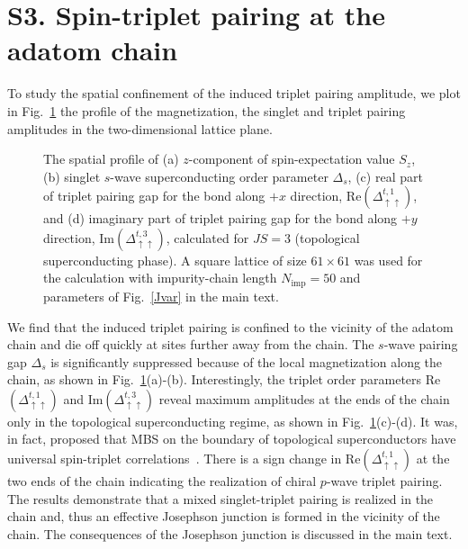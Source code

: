 \documentclass[aps,prl,reprint,nobibnotes]{revtex4-1}
\begin{document}
\section{S3. Spin-triplet pairing at the adatom chain}
To study the spatial confinement of the induced triplet pairing amplitude, we plot in Fig.~\ref{pairing_profile} the profile of the magnetization, the singlet and triplet pairing amplitudes in the two-dimensional lattice plane. 
\begin{figure}[htb!]
\begin{center}
\caption{The spatial profile of (a) $z$-component of spin-expectation value $S_{z}$, (b) singlet $s$-wave superconducting order parameter $\Delta_s$, (c) real part of triplet pairing gap for the bond along $+x$ direction, Re$(\Delta_{\uparrow \uparrow}^{t,1})$, and (d) imaginary part of triplet pairing gap for the bond along $+y$ direction, Im$(\Delta_{\uparrow \uparrow}^{t,3})$, calculated for $JS=3$ (topological superconducting phase). A square lattice of size $61 \times 61$ was used for the calculation with impurity-chain length $N_{\text{imp}}=50$ and parameters of Fig.~\ref{Jvar} in the main text.} 
\label{pairing_profile}
\end{center}
\end{figure}
We find that the induced triplet pairing is confined to the vicinity of the adatom chain and die off quickly at sites further away from the chain. The $s$-wave pairing gap $\Delta_s$ is significantly suppressed because of the local magnetization along the chain, as shown in Fig.~\ref{pairing_profile}(a)-(b). Interestingly, the triplet order parameters Re$(\Delta_{\uparrow \uparrow}^{t,1})$ and Im$(\Delta_{\uparrow \uparrow}^{t,3})$ reveal maximum amplitudes at the ends of the chain only in the topological superconducting regime, as shown in Fig.~\ref{pairing_profile}(c)-(d). It was, in fact, proposed that MBS on the boundary of topological superconductors have universal spin-triplet correlations~\cite{Liu_PRB2015}. There is a sign change in Re$(\Delta_{\uparrow \uparrow}^{t,1})$ at the two ends of the chain indicating the realization of chiral $p$-wave triplet pairing. The results demonstrate that a mixed singlet-triplet pairing is realized in the chain and, thus an effective Josephson junction is formed in the vicinity of the chain. The consequences of the  Josephson junction is discussed in the main text.
\end{document}
